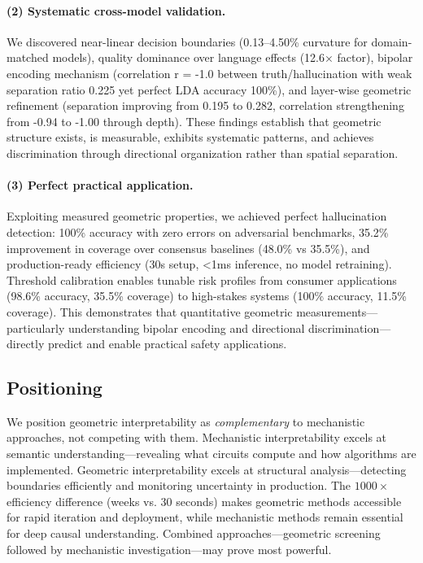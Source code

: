 \documentclass[11pt]{article}
\begin{document}
\paragraph{(2) Systematic cross-model validation.} We discovered near-linear decision boundaries (0.13--4.50\% curvature for domain-matched models), quality dominance over language effects (12.6× factor), bipolar encoding mechanism (correlation r = -1.0 between truth/hallucination with weak separation ratio 0.225 yet perfect LDA accuracy 100\%), and layer-wise geometric refinement (separation improving from 0.195 to 0.282, correlation strengthening from -0.94 to -1.00 through depth). These findings establish that geometric structure exists, is measurable, exhibits systematic patterns, and achieves discrimination through directional organization rather than spatial separation.

\paragraph{(3) Perfect practical application.} Exploiting measured geometric properties, we achieved perfect hallucination detection: 100\% accuracy with zero errors on adversarial benchmarks, 35.2\% improvement in coverage over consensus baselines (48.0\% vs 35.5\%), and production-ready efficiency (30s setup, <1ms inference, no model retraining). Threshold calibration enables tunable risk profiles from consumer applications (98.6\% accuracy, 35.5\% coverage) to high-stakes systems (100\% accuracy, 11.5\% coverage). This demonstrates that quantitative geometric measurements---particularly understanding bipolar encoding and directional discrimination---directly predict and enable practical safety applications.

\subsection{Positioning}

We position geometric interpretability as \textit{complementary} to mechanistic approaches, not competing with them. Mechanistic interpretability excels at semantic understanding---revealing what circuits compute and how algorithms are implemented. Geometric interpretability excels at structural analysis---detecting boundaries efficiently and monitoring uncertainty in production. The $1000\times$ efficiency difference (weeks vs. 30 seconds) makes geometric methods accessible for rapid iteration and deployment, while mechanistic methods remain essential for deep causal understanding. Combined approaches---geometric screening followed by mechanistic investigation---may prove most powerful.
\end{document}
